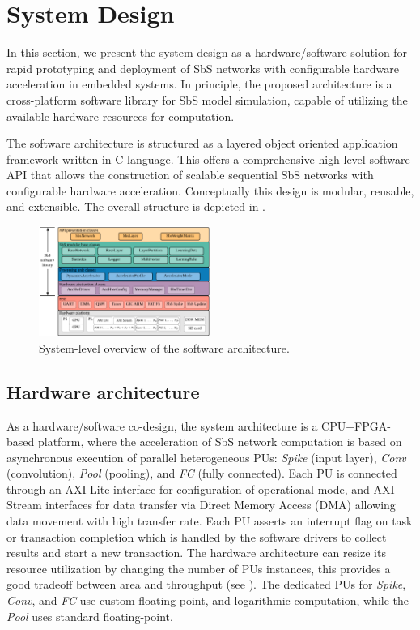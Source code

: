 \section{System Design}
\label{sec:system_design}
In this section, we present the system design as a hardware/software solution for rapid prototyping and deployment of SbS networks with configurable hardware acceleration in embedded systems\cite{nevarez2020accelerator}. In principle, the proposed architecture is a cross-platform software library for SbS model simulation, capable of utilizing the available hardware resources for computation.

The software architecture is structured as a layered object oriented application framework written in C language. This offers a comprehensive high level software API that allows the construction of scalable sequential SbS networks with configurable hardware acceleration. Conceptually this design is modular, reusable, and extensible. The overall structure is depicted in .

\begin{figure}
	\centering
	\includegraphics[width=0.5\textwidth]{../figures/sbs_software_component.pdf}
	\caption{System-level overview of the software architecture.}
	\label{fig:sw_stack}
\end{figure}

\subsection{Hardware architecture} \label{Hardware_architecture}
As a hardware/software co-design, the system architecture is a CPU+FPGA-based platform, where the acceleration of SbS network computation is based on asynchronous execution of parallel heterogeneous PUs: \emph{Spike} (input layer), \emph{Conv} (convolution), \emph{Pool} (pooling), and \emph{FC} (fully connected). Each PU is connected through an AXI-Lite interface for configuration of operational mode, and AXI-Stream interfaces for data transfer via Direct Memory Access (DMA) allowing data movement with high transfer rate. Each PU asserts an interrupt flag on task or transaction completion which is handled by the software drivers to collect results and start a new transaction. The hardware architecture can resize its resource utilization by changing the number of PUs instances, this provides a good tradeoff between area and throughput (see ). The dedicated PUs for \emph{Spike}, \emph{Conv}, and \emph{FC} use custom floating-point, and logarithmic computation, while the \emph{Pool} uses standard floating-point.

